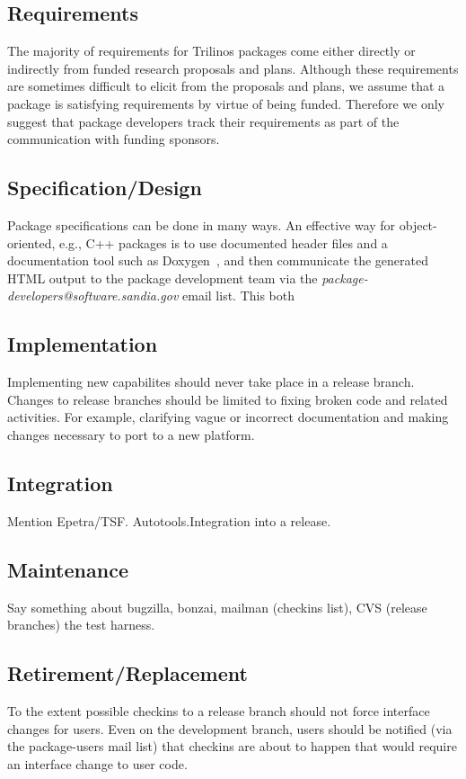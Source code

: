 \documentclass[12pt,relax]{TrilinosDevGuide}
\begin{document}
\subsection{Requirements}
The majority of requirements for Trilinos packages come either directly or 
indirectly from funded research proposals and plans.  Although these 
requirements are sometimes difficult to elicit from the proposals and plans, 
we assume that a package is satisfying requirements by virtue of being 
funded.  Therefore we only suggest that package developers track their 
requirements as part of the communication with funding sponsors.

\subsection{Specification/Design}
Package specifications can be done in many ways.  An effective way for 
object-oriented, e.g., C++ packages is to use documented header files and a 
documentation tool such as Doxygen~\cite{doxyen}, and then communicate the 
generated HTML output to the package development team via the 
{\it package-developers@software.sandia.gov} email list.  This both

\subsection{Implementation}
Implementing new capabilites should never take place in a release branch.  
Changes to release branches should be limited to fixing broken code and 
related activities.  For example, clarifying vague or incorrect documentation 
and making changes necessary to port to a new platform.

\subsection{Integration}
Mention Epetra/TSF. Autotools.Integration into a release.

\subsection{Maintenance}
Say something about bugzilla, bonzai, mailman (checkins list), CVS (release 
branches) the test harness.

\subsection{Retirement/Replacement}
To the extent possible checkins to a release branch should not force interface 
changes for users.  Even on the development branch, users should be notified 
(via the package-users mail list) that checkins are about to happen that would 
require an interface change to user code.
\end{document}
